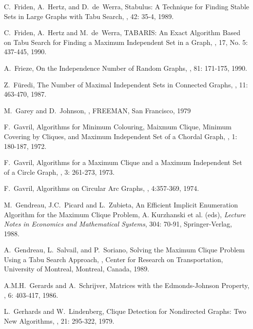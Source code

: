 \begin{thebibliography}{10}
C.~Friden, A.~Hertz, and D.~de~Werra,
\newblock Stabulus: A Technique for Finding Stable Sets in Large
Graphs with Tabu Search,
, 42: 35-4, 1989.

C.~Friden, A.~Hertz and M.~de~Werra,
\newblock TABARIS: An Exact Algorithm Based on Tabu Search for
Finding a Maximum Independent Set in a Graph,
, 17, No. 5:
437-445, 1990.

A.~Frieze,
\newblock On the Independence Number of Random Graphs,
, 81: 171-175, 1990.

Z.~F\"{u}redi,
\newblock The Number of Maximal Independent Sets in Connected Graphs,
, 11: 463-470, 1987.

M.~Garey and D.~Johnson,
,
\newblock FREEMAN, San Francisco, 1979

F.~Gavril,
\newblock Algorithms for Minimum Colouring, Maixmum Clique, Minimum
Covering by Cliques, and Maximum Independent Set of a Chordal Graph,
, 1: 180-187, 1972.

F.~Gavril,
\newblock Algorithms for a Maximum Clique and a Maximum Independent
Set of a Circle Graph,
, 3: 261-273, 1973.

F.~Gavril,
\newblock Algorithms on Circular Arc Graphs,
, 4:357-369, 1974.

M.~Gendreau, J.C.~Picard and L.~Zubieta,
\newblock An Efficient Implicit Enumeration Algorithm for the
Maximum Clique Problem,
\newblock A. Kurzhanski et al. (eds), {\em Lecture Notes in
Economics and Mathematical Systems}, 304: 70-91, Springer-Verlag,  
1988. 


A.~Gendreau, L.~Salvail, and P.~Soriano,
\newblock Solving the Maximum Clique Problem Using a Tabu Search
Approach,
, Center for Research on
Transportation, University of Montreal, Montreal, Canada, 1989.

A.M.H.~Gerards and A.~Schrijver,
\newblock Matrices with the Edmonds-Johnson Property,
, 6: 403-417, 1986.

L.~Gerhards and W.~Lindenberg,
\newblock Clique Detection for Nondirected Graphs: Two New
Algorithms,
, 21: 295-322, 1979.


\end{thebibliography}
